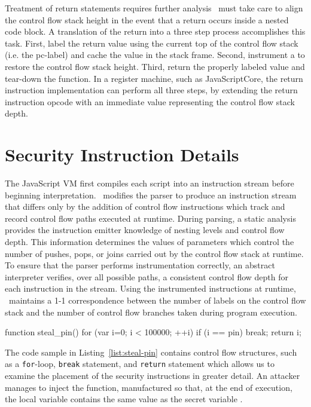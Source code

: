 Treatment of return statements requires further analysis
\FlowCore\ must take care to align the control flow stack height in the event that a return occurs inside a nested code block.
A translation of the return into a three step process accomplishes this task.
First, label the return value using the current top of the control flow stack (i.e. the pc-label) and cache the value in the stack frame.
Second, instrument a \popj to restore the control flow stack height.
Third, return the properly labeled value and tear-down the function.
In a register machine, such as JavaScriptCore, the return instruction implementation can perform all three steps, by extending the return instruction opcode with an immediate value representing the control flow stack depth.

\section{Security Instruction Details}

The JavaScript VM first compiles each script into an instruction stream before beginning interpretation.
\FlowCore\ modifies the parser to produce an instruction stream that differs only by the addition of control flow instructions which track and record control flow paths executed at runtime.
During parsing, a static analysis provides the instruction emitter knowledge of nesting levels and control flow depth.
This information determines the values of parameters which control the number of pushes, pops, or joins carried out by the control flow stack at runtime.
To ensure that the parser performs instrumentation correctly, an abstract interpreter verifies, over all possible paths, a consistent control flow depth for each instruction in the stream.
Using the instrumented instructions at runtime, \FlowCore\ maintains a 1-1 correspondence between the number of labels on the control flow stack and the number of control flow branches taken during program execution.

\begin{jscode}
function steal_pin() {
  for (var i=0; i < 100000; ++i) {
    if (i == pin) break;
  }
  return i;
}
\end{jscode}

The code sample in Listing~\ref{list:steal-pin} contains control flow structures, such as a \texttt{for}-loop, \texttt{break} statement, and \texttt{return} statement which allows us to examine the placement of the security instructions in greater detail.
An attacker manages to inject the  function, manufactured so that, at the end of execution, the local variable  contains the same value as the secret variable .


